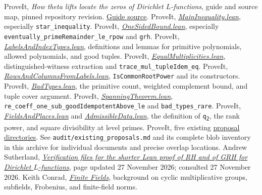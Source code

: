 \documentclass[11pt,a4paper]{article}
\newcommand{\src}[1]{\nolinkurl{#1}}
\newcommand{\repobase}{https://github.com/VladimirReshetnikov/ProveIt/blob/89d12dd40424f1217fd818d84877b3da52396a3b/Analysis/GeneralizedRiemannHypothesis}
\newcommand{\sourcefile}[2]{\href{\repobase/Lean/grh/src/#1}{#2}}
\theoremstyle{definition}
\theoremstyle{remark}
\begin{document}
\begin{thebibliography}{20}
\small
{} ProveIt, \emph{How theta lifts locate the zeros of Dirichlet
$L$-functions}, guide and source map, pinned repository revision.
\href{\repobase/docs/guide/theta_lifts_and_dirichlet_zeros.tex}{Guide source}.
 ProveIt,
\sourcefile{New/Reduction/MainInequality.lean}{\emph{MainInequality.lean}},
especially \src{star_inequality}.
 ProveIt,
\sourcefile{New/Reduction/OneSidedBound.lean}{\emph{OneSidedBound.lean}},
especially \src{eventually_primeRemainder_le_rpow} and \src{grh}.
 ProveIt,
\sourcefile{New/UpperBound/Objects/LabelsAndIndexTypes.lean}{\emph{LabelsAndIndexTypes.lean}},
definitions and lemmas for primitive polynomials, allowed polynomials,
and good tuples.
 ProveIt,
\sourcefile{New/Spanning/Multiplicities/EqualMultiplicities.lean}{\emph{EqualMultiplicities.lean}},
distinguished-witness extraction and \src{trace_mul_tupleIdem_eq}.
 ProveIt,
\sourcefile{New/Congruences/GaloisRepresentations/RowsAndColumnsFromLabels.lean}{\emph{RowsAndColumnsFromLabels.lean}},
\src{IsCommonRootPower} and its constructors.
 ProveIt,
\sourcefile{New/Spanning/MainTerm/BadTypes.lean}{\emph{BadTypes.lean}},
the primitive count, weighted complement bound, and tuple cover argument.
 ProveIt,
\sourcefile{New/Spanning/SecondMoment/SpanningTheorem.lean}{\emph{SpanningTheorem.lean}},
\src{re_coeff_one_sub_goodIdempotentAbove_le} and \src{bad_types_rare}.
 ProveIt,
\sourcefile{New/Reduction/Data/FieldsAndPlaces.lean}{\emph{FieldsAndPlaces.lean}}
and
\sourcefile{New/Reduction/Data/AdmissibleData.lean}{\emph{AdmissibleData.lean}},
the definition of \texttt{q\textsubscript{2}}, the rank power, and square divisibility at
level primes.
 ProveIt, five existing
\href{https://github.com/VladimirReshetnikov/ProveIt/tree/89d12dd40424f1217fd818d84877b3da52396a3b/Analysis/GeneralizedRiemannHypothesis/docs/proposals}{proposal directories}.
See \src{audit/existing_proposals.md} and its complete blob inventory
in this archive for individual documents and precise overlap locations.
 Andrew Sutherland,
\href{https://math.mit.edu/~drew/shortgrh/}{\emph{Verification files for the
shorter Lean proof of RH and of GRH for Dirichlet $L$-functions}},
page updated 27 November 2026; consulted 27 November 2026.
 Keith Conrad,
\href{https://kconrad.math.uconn.edu/blurbs/galoistheory/finitefields.pdf}{\emph{Finite Fields}},
background on cyclic multiplicative groups, subfields, Frobenius, and
finite-field norms.
\end{thebibliography}
\end{document}
